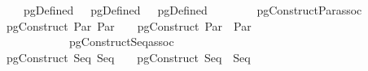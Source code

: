 \isanewline
\ \ \ {\isachardoublequoteopen}pgDefined\ \ \ {\isachardoublequoteopen}pgDefined\ \ \ {\isachardoublequoteopen}pgDefined\ \isanewline
\ \ \ \ \ \ \ pgConstruct{\isacharunderscore}Par{\isacharunderscore}assoc{\isacharcolon}\isanewline
{}pgConstruct\ {\isacharparenleft}Par\ {\isacharparenleft}Par\ \ \ {\isasymapprox}\ pgConstruct\ {\isacharparenleft}Par\ \ {\isacharparenleft}Par\ \isanewline
\ \ \ \ \ \ \ \ \ \ \ pgConstruct{\isacharunderscore}Seq{\isacharunderscore}assoc{\isacharcolon}\isanewline
{}pgConstruct\ {\isacharparenleft}Seq\ {\isacharparenleft}Seq\ \ \ {\isasymapprox}\ pgConstruct\ {\isacharparenleft}Seq\ \ {\isacharparenleft}Seq\ 
